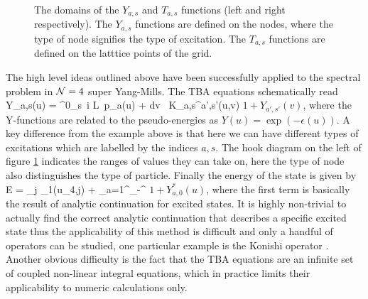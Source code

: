 \begin{figure}[t]
\caption{The domains of the $Y_{a,s}$ and $T_{a,s}$ functions (left and right respectively). The $Y_{a,s}$ functions are defined on the nodes, where the type of node signifies the type of excitation. The $T_{a,s}$ functions are defined on the latttice points of the grid.}
\label{fig:yt_hooks}
\end{figure}

The high level ideas outlined above have been successfully applied to the spectral problem in $\mathcal{N}=4$ super Yang-Mills.
The TBA equations schematically read \cite{Gromov:2009bc, Arutyunov:2009ur}
\beq
	\label{eq:tba_final}
	\log Y_{a,s}(u) = \delta^0_s\, i L\, p_a(u) + \int dv \, K_{a,s}^{a',s'}(u,v) \log \( 1+Y_{a',s'}(v) \),
\eeq
where the Y-functions are related to the pseudo-energies as $Y(u) = \exp(-\epsilon(u))$.
A key difference from the example above is that here we can have different types of excitations which are labelled by the indices $a,s$. 
The hook diagram on the left of figure \ref{fig:yt_hooks} indicates the ranges of values they can take on,
here the type of node also distinguishes the type of particle.
Finally the energy of the state is given by
\beq
	E = \sum_j \epsilon_1(u_{4,j}) + \sum_{a=1}^\infty \int_{-\infty}^\infty {}  \log \(1 + Y_{a,0}^* (u) \),
\eeq
where the first term is basically the result of analytic continuation for excited states.
It is highly non-trivial to actually find the correct analytic continuation that describes a specific excited state thus the applicability of this method is difficult and only a handful of operators can be studied, one particular example is the Konishi operator \cite{Gromov:2009zb}.
Another obvious difficulty is the fact that the TBA equations  are an infinite set of coupled non-linear integral equations, which in practice limits their applicability to numeric calculations only. 


